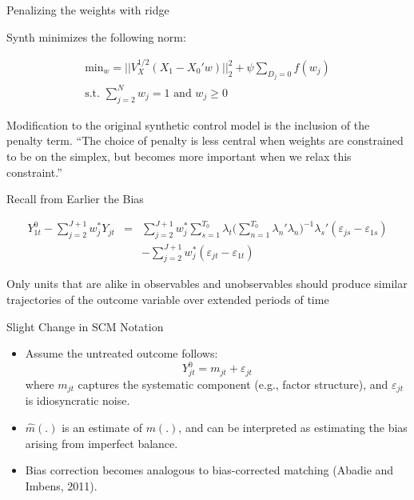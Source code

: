 \documentclass{beamer}
\begin{document}
\begin{frame}{Penalizing the weights with ridge}

Synth minimizes the following norm:

\begin{eqnarray*}
\textrm{min}_w = || V_X^{1/2} (X_1 - X_0'w) ||_2^2 + \psi \sum_{D_j=0}f(w_j)\\
\textrm{s.t. }\sum_{j=2}^N w_{j} =1 \textrm{ and } w_j \geq 0
\end{eqnarray*}

Modification to the original synthetic control model is the inclusion of the penalty term. ``The choice of penalty is less central when weights are constrained to be on the simplex, but becomes more important when we relax this constraint.''

\end{frame}







\begin{frame}{Recall from Earlier the Bias}


\begin{eqnarray*}
Y^0_{1t} - \sum^{J+1}_{j=2}w^*_jY_{jt} &=& \sum_{j=2}^{J+1} w_j^* \sum_{s=1}^{T_0} \lambda_t \bigg ( \sum_{n=1}^{T_0} \lambda_n'\lambda_n \bigg )
^{-1} \lambda_s'(\varepsilon_{js} - \varepsilon_{1s} ) \\
&& - \sum_{j=2}^{J+1} w_j^* (\varepsilon_{jt} - \varepsilon_{1t})
\end{eqnarray*}

Only units that are alike in observables and unobservables should produce similar trajectories of the outcome variable over extended periods of time


\end{frame}



\begin{frame}{Slight Change in SCM Notation}
\small
\begin{itemize}
  \item Assume the untreated outcome follows:
  \[
  Y_{jt}^0 = m_{jt} + \varepsilon_{jt}
  \]
  where $m_{jt}$ captures the systematic component (e.g., factor structure), and $\varepsilon_{jt}$ is idiosyncratic noise.
  \item $\widehat{m}(.)$ is an estimate of $m(.)$, and can be interpreted as estimating the bias arising from imperfect balance.
  \item Bias correction becomes analogous to bias-corrected matching (Abadie and Imbens, 2011).
\end{itemize}
\end{frame}
\end{document}
